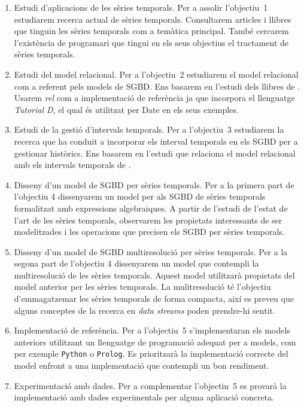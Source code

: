 \begin{enumerate}


\item Estudi d'aplicacions de les sèries temporals. Per a assolir
  l'objectiu~1 estudiarem recerca actual de sèries temporals.
  Consultarem articles i llibres que tinguin les sèries temporals com
  a temàtica principal. També cercarem l'existència de programari que
  tingui en els seus objectius el tractament de sèries temporals.

\item Estudi del model relacional. Per a l'objectiu~2 estudiarem el
  model relacional com a referent pels models de SGBD. Ens basarem en
  l'estudi dels llibres de
  \textcite{date:introduction,date06,date:dictionary}. Usarem
  \emph{rel} \parencite{rel} com a implementació de referència ja que
  incorpora el llenguatge \emph{Tutorial D}, el qual és utilitzat per
  Date en els seus exemples.

\item Estudi de la gestió d'intervals temporals. Per a l'objectiu~3
  estudiarem la recerca que ha conduit a incorporar els interval
  temporals en els SGBD per a gestionar històrics. Ens basarem en
  l'estudi que relaciona el model relacional amb els intervals
  temporals de \textcite{date02:_tempor_data_relat_model}.

\item Disseny d'un model de SGBD per sèries temporals. Per a la
  primera part de l'objectiu 4 dissenyarem un model per als SGBD de
  sèries temporals formalitzat amb expressions algebraiques. A partir
  de l'estudi de l'estat de l'art de les sèries temporals, observarem
  les propietats interessants de ser modelitzades i les operacions que
  precisen els SGBD per sèries temporals.

\item Disseny d'un model de SGBD multiresolució per sèries
  temporals. Per a la segona part de l'objectiu 4 dissenyarem un model
  que contempli la multiresolució de les sèries temporals. Aquest
  model utilitzarà propietats del model anterior per les sèries
  temporals. La mulitresolució té l'objectiu d'emmagatzemar les sèries
  temporals de forma compacta, així es preveu que alguns conceptes de la recerca
  en \emph{data streams} poden prendre-hi sentit.

\item Implementació de referència. Per a l'objectiu~5 s'implementaran
  els models anteriors utilitzant un llenguatge de programació adequat
  per a models, com per exemple \texttt{Python} o \texttt{Prolog}.  Es
  prioritzarà la implementació correcte del model enfront a una
  implementació que contempli un bon rendiment. 

\item Experimentació amb dades. Per a complementar l'objectiu~5 es
  provarà la implementació amb dades experimentals per alguna
  aplicació concreta.

\end{enumerate}

